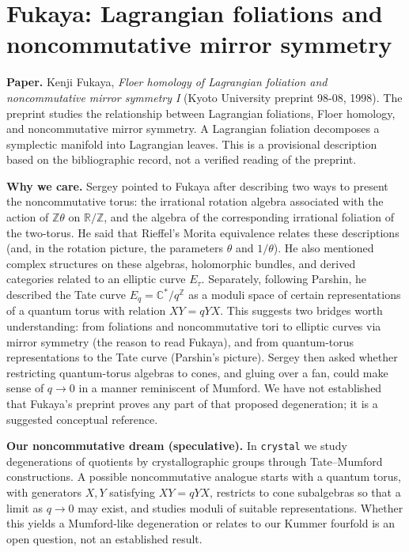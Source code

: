 \section{Fukaya: Lagrangian foliations and noncommutative mirror symmetry}
\label{section-fukaya-lagrangian-foliations}

\noindent
\textbf{Paper.} Kenji Fukaya, \emph{Floer homology of Lagrangian foliation and noncommutative mirror symmetry I} (Kyoto University preprint 98-08, 1998). The preprint studies the relationship between Lagrangian foliations, Floer homology, and noncommutative mirror symmetry. A Lagrangian foliation decomposes a symplectic manifold into Lagrangian leaves. This is a provisional description based on the bibliographic record, not a verified reading of the preprint.

\medskip\noindent
\textbf{Why we care.} Sergey pointed to Fukaya after describing two ways to present the noncommutative torus: the irrational rotation algebra associated with the action of $\mathbb Z\theta$ on $\mathbb R/\mathbb Z$, and the algebra of the corresponding irrational foliation of the two-torus. He said that Rieffel's Morita equivalence relates these descriptions (and, in the rotation picture, the parameters $\theta$ and $1/\theta$). He also mentioned complex structures on these algebras, holomorphic bundles, and derived categories related to an elliptic curve $E_\tau$. Separately, following Parshin, he described the Tate curve $E_q=\mathbb C^*/q^{\mathbb Z}$ as a moduli space of certain representations of a quantum torus with relation $XY=qYX$. This suggests two bridges worth understanding: from foliations and noncommutative tori to elliptic curves via mirror symmetry (the reason to read Fukaya), and from quantum-torus representations to the Tate curve (Parshin's picture). Sergey then asked whether restricting quantum-torus algebras to cones, and gluing over a fan, could make sense of $q\to0$ in a manner reminiscent of Mumford. We have not established that Fukaya's preprint proves any part of that proposed degeneration; it is a suggested conceptual reference.

\medskip\noindent
\textbf{Our noncommutative dream (speculative).} In \texttt{crystal} we study degenerations of quotients by crystallographic groups through Tate--Mumford constructions. A possible noncommutative analogue starts with a quantum torus, with generators $X,Y$ satisfying $XY=qYX$, restricts to cone subalgebras so that a limit as $q\to0$ may exist, and studies moduli of suitable representations. Whether this yields a Mumford-like degeneration or relates to our Kummer fourfold is an open question, not an established result.

